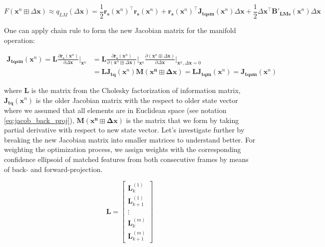 \documentclass[a4paper]{report}
\numberwithin{figure}{section}
\begin{document}
\begin{appendices}
\begin{equation}
  F(\mathbf{x}^n \boxplus \Delta \mathbf{x}) \approx 
  q_{LM} (\Delta \mathbf{x}) = 
  \frac{1}{2}
\mathbf{r_s}(\mathbf{x}^n)^\top\mathbf{r_s}(\mathbf{x}^n) + 
\mathbf{r_s}(\mathbf{x}^n)^\top\mathbf{J_{tqsm}}(\mathbf{x}^n)\Delta 
\mathbf{x} + 
\frac{1}{2} \Delta \mathbf{x}^\top\mathbf{B'_{LMs}}(\mathbf{x}^n)\Delta 
\mathbf{x}
\end{equation}

One can apply chain rule to form the new Jacobian matrix for the manifold operation:

\begin{equation}
  \begin{aligned}
  \mathbf{J_{tqsm}}(\mathbf{x}^n) = 
  \mathbf{L} \frac{\partial \mathbf{r_s}(\mathbf{x}^n)}
  {\partial \Delta \mathbf{x}} \bigg|_{\mathbf{x}^n} & = 
  \mathbf{L} \frac{\partial \mathbf{r_s}(\mathbf{x}^n)}
{\partial (\mathbf{x}^n \boxplus \Delta \mathbf{x})} \bigg|_{\mathbf{x}^n}
  \frac{\partial (\mathbf{x}^n \boxplus \Delta \mathbf{x})}
  {\partial \Delta \mathbf{x}} \bigg|_{\mathbf{x}^n,\Delta \mathbf{x}=0} \\
  & = 
  \mathbf{L}\mathbf{J_{tq}}(\mathbf{x}^n) 
  \mathbf{M}(\mathbf{\mathbf{x}^n \boxplus \Delta \mathbf{x}})
  = 
  \mathbf{L}\mathbf{J_{tqm}}(\mathbf{x}^n)
  = 
  \mathbf{J_{tqsm}}(\mathbf{x}^n)
\end{aligned}
\end{equation}\label{eq:new_jacobian_chain_rule}

where $\mathbf{L}$ is the matrix from the Cholesky factorization of information matrix, 
$\mathbf{J_{tq}}(\mathbf{x}^n)$ is the older Jacobian matrix with the respect 
to 
older state vector where we assumed that all elements are in Euclidean space 
(see notation \eqref{eq:jacob_back_proj}), 
$\mathbf{M}(\mathbf{\mathbf{x}^n \boxplus \Delta \mathbf{x}})$ is the 
matrix that we form by taking partial derivative with respect to new state vector.
Let's investigate further by breaking the new Jacobian matrix into smaller matrices 
to understand better. For weighting the optimization process, 
we assign weights with the corresponding confidence ellipsoid of matched 
features 
from both consecutive frames by means of back- and forward-projection.

\begin{equation}
  \mathbf{L} 
  =
  \begin{bmatrix}
    \mathbf{L}^{(1)}_{k} \\
    \mathbf{L}^{(1)}_{k+1} \\
    \vdots \\
    \mathbf{L}^{(m)}_{k} \\
    \mathbf{L}^{(m)}_{k+1}
  \end{bmatrix}
\end{equation}


\end{appendices}
\end{document}
